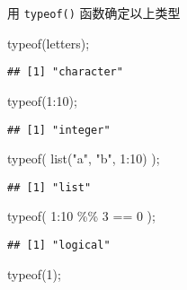\documentclass[ignorenonframetext,]{beamer}
\newenvironment{Shaded}{\begin{snugshade}}{\end{snugshade}}
\newcommand{\DecValTok}[1]{\textcolor[rgb]{0.00,0.00,0.81}{#1}}
\newcommand{\FunctionTok}[1]{\textcolor[rgb]{0.00,0.00,0.00}{#1}}
\newcommand{\NormalTok}[1]{#1}
\newcommand{\SpecialCharTok}[1]{\textcolor[rgb]{0.00,0.00,0.00}{#1}}
\newcommand{\StringTok}[1]{\textcolor[rgb]{0.31,0.60,0.02}{#1}}
\newcommand\FontSmall{\fontsize{7}{8}\selectfont}
\begin{document}
\begin{frame}[fragile]{用 \texttt{typeof()} 函数确定以上类型}
\protect\hypertarget{ux7528-typeof-ux51fdux6570ux786eux5b9aux4ee5ux4e0aux7c7bux578b}{}
\FontSmall

\begin{Shaded}
\begin{Highlighting}[]
\FunctionTok{typeof}\NormalTok{(letters);}
\end{Highlighting}
\end{Shaded}

\begin{verbatim}
## [1] "character"
\end{verbatim}

\begin{Shaded}
\begin{Highlighting}[]
\FunctionTok{typeof}\NormalTok{(}\DecValTok{1}\SpecialCharTok{:}\DecValTok{10}\NormalTok{);}
\end{Highlighting}
\end{Shaded}

\begin{verbatim}
## [1] "integer"
\end{verbatim}

\begin{Shaded}
\begin{Highlighting}[]
\FunctionTok{typeof}\NormalTok{( }\FunctionTok{list}\NormalTok{(}\StringTok{"a"}\NormalTok{, }\StringTok{"b"}\NormalTok{, }\DecValTok{1}\SpecialCharTok{:}\DecValTok{10}\NormalTok{) );}
\end{Highlighting}
\end{Shaded}

\begin{verbatim}
## [1] "list"
\end{verbatim}

\begin{Shaded}
\begin{Highlighting}[]
\FunctionTok{typeof}\NormalTok{( }\DecValTok{1}\SpecialCharTok{:}\DecValTok{10} \SpecialCharTok{\%\%} \DecValTok{3} \SpecialCharTok{==} \DecValTok{0}\NormalTok{ );}
\end{Highlighting}
\end{Shaded}

\begin{verbatim}
## [1] "logical"
\end{verbatim}

\begin{Shaded}
\begin{Highlighting}[]
\FunctionTok{typeof}\NormalTok{(}\DecValTok{1}\NormalTok{);}
\end{Highlighting}
\end{Shaded}


\end{frame}
\end{document}
